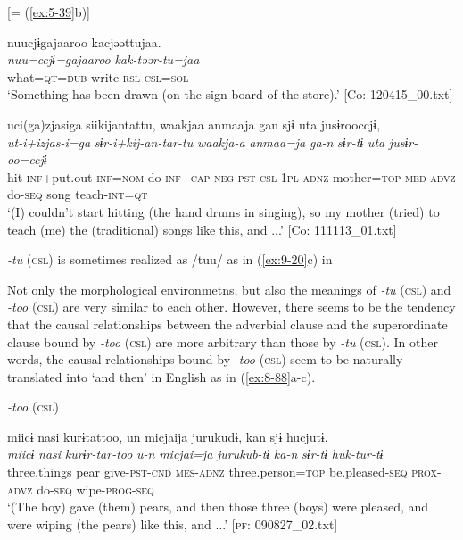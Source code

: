 \ex {}[= (\ref{ex:5-39}b)]

{\TM}
\glll  nuucjɨgajaaroo  kacjəəttujaa.\\
\textit{nuu=ccjɨ=gajaaroo}  \textit{kak-təər-tu=jaa}\\
what=\textsc{qt}=\textsc{dub}  write-\textsc{rsl}-\textsc{csl}=\textsc{sol}\\
\glt ‘Something has been drawn (on the sign board of the store).’ [Co: 120415\_00.txt]

\ex
{\TM}
\glll  uci(ga)zjasiga  siikijantattu,  waakjaa      anmaaja  gan  sjɨ  uta  jusɨrooccjɨ,
\\
\textit{ut-i+izjas-i=ga}  \textit{sɨr-i+kij-an-tar-tu}  \textit{waakja-a}      \textit{anmaa=ja}  \textit{ga-n}  \textit{sɨr-tɨ}  \textit{uta}  \textit{jusɨr-oo=ccjɨ}\\
hit-\textsc{inf}+put.out-\textsc{inf}=\textsc{nom}  do-\textsc{inf}+\textsc{cap}-\textsc{neg}-\textsc{pst}-\textsc{csl}  1\textsc{pl}-\textsc{adnz}   mother=\textsc{top}  \textsc{med}-\textsc{advz}  do-\textsc{seq}  song  teach-\textsc{int}=\textsc{qt}\\
\glt ‘(I) couldn’t start hitting (the hand drums in singing), so my mother (tried) to teach (me) the (traditional) songs like this, and ...’ [Co: 111113\_01.txt]
\z
\z

\textit{-tu} (\textsc{csl}) is sometimes realized as /tuu/ as in (\ref{ex:9-20}c) in 

Not only the morphological environmetns, but also the meanings of \textit{-tu} (\textsc{csl}) and \textit{-too} (\textsc{csl}) are very similar to each other. However, there seems to be the tendency that the causal relationships between the adverbial clause and the superordinate clause bound by \textit{-too} (\textsc{csl}) are more arbitrary than those by \textit{-tu} (\textsc{csl}). In other words, the causal relationships bound by \textit{-too} (\textsc{csl}) seem to be naturally translated into ‘and then’ in English as in (\ref{ex:8-88}a-c).

\ea\label{ex:8-88}
  \textit{-too} (\textsc{csl})

\ea
{\TM}
\glll  miicɨ  nasi  kurɨtattoo,  un  micjaija      jurukudɨ,  kan  sjɨ  hucjutɨ,\\
\textit{miicɨ}  \textit{nasi}  \textit{kurɨr-tar-too}  \textit{u-n}  \textit{micjai=ja}   \textit{jurukub-tɨ}  \textit{ka-n}  \textit{sɨr-tɨ}  \textit{huk-tur-tɨ}\\
three.things  pear  give-\textsc{pst}-\textsc{cnd}  \textsc{mes}-\textsc{adnz}  three.person=\textsc{top}   be.pleased-\textsc{seq}  \textsc{prox}-\textsc{advz}  do-\textsc{seq}  wipe-\textsc{prog}-\textsc{seq}\\
\glt ‘(The boy) gave (them) pears, and then those three (boys) were pleased, and were wiping (the pears) like this, and ...’ [\textsc{pf}: 090827\_02.txt]

